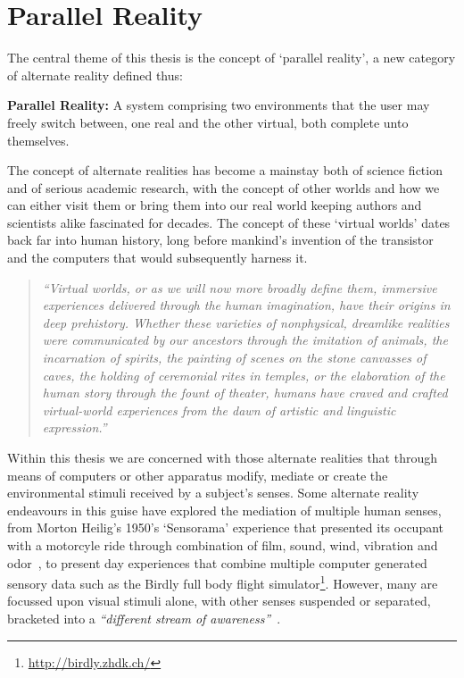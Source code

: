 
\section{Parallel Reality}
\label{intro-parallel-reality}
The central theme of this thesis is the concept of `parallel reality', a new category of alternate reality defined thus:


\textbf{Parallel Reality:} A system comprising two environments that the user may freely switch between, one real and the other virtual, both complete unto themselves.



The concept of alternate realities has become a mainstay both of science fiction and of serious academic research, with the concept of other worlds and how we can either visit them or bring them into our real world keeping authors and scientists alike fascinated for decades. The concept of these `virtual worlds' dates back far into human history, long before mankind's invention of the transistor and the computers that would subsequently harness it.

\begin{quote}
	\textit{``Virtual worlds, or as we will now more broadly define them, immersive experiences delivered through the human imagination, have their origins in deep prehistory. Whether these varieties of nonphysical, dreamlike realities were communicated by our ancestors through the imitation of animals, the incarnation of spirits, the painting of scenes on the stone canvasses of caves, the holding of ceremonial rites in temples, or the elaboration of the human story through the fount of theater, humans have craved and crafted virtual-world experiences from the dawn of artistic and linguistic expression.''}~\cite{Damer2014}
\end{quote}

Within this thesis we are concerned with those alternate realities that through means of computers or other apparatus modify, mediate or create the environmental stimuli received by a subject's senses. Some alternate reality endeavours in this guise have explored the mediation of multiple human senses, from Morton Heilig's 1950's `Sensorama' experience that presented its occupant with a motorcyle ride through combination of film, sound, wind, vibration and odor~\cite{Rheingold1992}, to present day experiences that combine multiple computer generated sensory data such as the Birdly full body flight simulator\footnote{\url{http://birdly.zhdk.ch/}}. However, many are focussed upon visual stimuli alone, with other senses suspended or separated, bracketed into a \textit{``different stream of awareness''}~\cite{Adams2014}.

